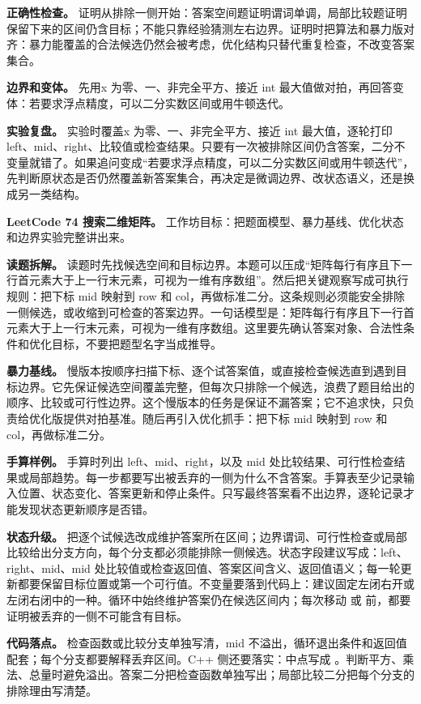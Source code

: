 \textbf{正确性检查。} 证明从排除一侧开始：答案空间题证明谓词单调，局部比较题证明保留下来的区间仍含目标；不能只靠经验猜测左右边界。证明时把算法和暴力版对齐：暴力能覆盖的合法候选仍然会被考虑，优化结构只替代重复检查，不改变答案集合。

\textbf{边界和变体。} 先用x 为零、一、非完全平方、接近 int 最大值做对拍，再回答变体：若要求浮点精度，可以二分实数区间或用牛顿迭代。

\textbf{实验复盘。} 实验时覆盖x 为零、一、非完全平方、接近 int 最大值，逐轮打印 left、mid、right、比较值或检查结果。只要有一次被排除区间仍含答案，二分不变量就错了。如果追问变成“若要求浮点精度，可以二分实数区间或用牛顿迭代”，先判断原状态是否仍然覆盖新答案集合，再决定是微调边界、改状态语义，还是换成另一类结构。

\noindent\textbf{LeetCode 74 搜索二维矩阵。} 工作坊目标：把题面模型、暴力基线、优化状态和边界实验完整讲出来。

\textbf{读题拆解。} 读题时先找候选空间和目标边界。本题可以压成“矩阵每行有序且下一行首元素大于上一行末元素，可视为一维有序数组”。然后把关键观察写成可执行规则：把下标 mid 映射到 row 和 col，再做标准二分。这条规则必须能安全排除一侧候选，或收缩到可检查的答案边界。一句话模型是：矩阵每行有序且下一行首元素大于上一行末元素，可视为一维有序数组。这里要先确认答案对象、合法性条件和优化目标，不要把题型名字当成推导。

\textbf{暴力基线。} 慢版本按顺序扫描下标、逐个试答案值，或直接检查候选直到遇到目标边界。它先保证候选空间覆盖完整，但每次只排除一个候选，浪费了题目给出的顺序、比较或可行性边界。这个慢版本的任务是保证不漏答案；它不追求快，只负责给优化版提供对拍基准。随后再引入优化抓手：把下标 mid 映射到 row 和 col，再做标准二分。

\textbf{手算样例。} 手算时列出 left、mid、right，以及 mid 处比较结果、可行性检查结果或局部趋势。每一步都要写出被丢弃的一侧为什么不含答案。手算表至少记录输入位置、状态变化、答案更新和停止条件。只写最终答案看不出边界，逐轮记录才能发现状态更新顺序是否错。

\textbf{状态升级。} 把逐个试候选改成维护答案所在区间；边界谓词、可行性检查或局部比较给出分支方向，每个分支都必须能排除一侧候选。状态字段建议写成：left、right、mid、mid 处比较值或检查返回值、答案区间含义、返回值语义；每一轮更新都要保留目标位置或第一个可行值。不变量要落到代码上：建议固定左闭右开或左闭右闭中的一种。循环中始终维护答案仍在候选区间内；每次移动  或  前，都要证明被丢弃的一侧不可能含有目标。

\textbf{代码落点。} 检查函数或比较分支单独写清，mid 不溢出，循环退出条件和返回值配套；每个分支都要解释丢弃区间。C++ 侧还要落实：中点写成 。判断平方、乘法、总量时避免溢出。答案二分把检查函数单独写出；局部比较二分把每个分支的排除理由写清楚。

